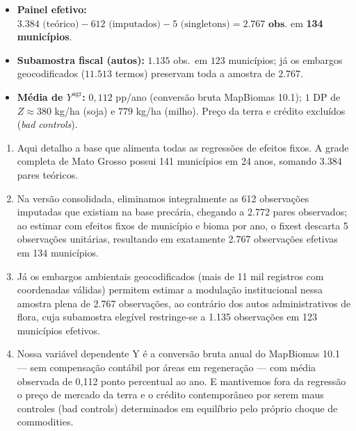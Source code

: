 \documentclass[11pt,a4paper]{article}
\begin{document}
\begin{tcolorbox}[title={\bfseries\small ÂNCORAS EMPÍRICAS E CONCEITUAIS DO SLIDE}]
\begin{itemize}[leftmargin=*,itemsep=1mm,topsep=0.5mm]
    \item \textbf{Painel efetivo:} $\text{3.384 (teórico)} - 612\text{ (imputados)} - 5\text{ (singletons)} = \mathbf{2.767\text{ obs.}}$ em \textbf{134 municípios}.
    \item \textbf{Subamostra fiscal (autos):} $1.135$ obs.\ em $123$ municípios; já os embargos geocodificados ($11.513$ termos) preservam toda a amostra de $2.767$.
    \item \textbf{Média de $Y^{\text{agr}}$:} $0{,}112$ pp/ano (conversão bruta MapBiomas 10.1); $1\text{ DP}$ de $Z \approx 380$ kg/ha (soja) e $779$ kg/ha (milho). Preço da terra e crédito excluídos (\textit{bad controls}).
\end{itemize}
\end{tcolorbox}
\vspace{2mm}

\vspace{0.8mm}
\begin{enumerate}[leftmargin=*,label=\textbf{(\arabic*)},itemsep=2.8mm,topsep=1mm]
    \item Aqui detalho a base que alimenta todas as regressões de efeitos fixos. A grade completa de Mato Grosso possui 141 municípios em 24 anos, somando 3.384 pares teóricos.
    \item Na versão consolidada, eliminamos integralmente as 612 observações imputadas que existiam na base precária, chegando a 2.772 pares observados; ao estimar com efeitos fixos de município e bioma por ano, o fixest descarta 5 observações unitárias, resultando em exatamente 2.767 observações efetivas em 134 municípios.
    \item Já os embargos ambientais geocodificados (mais de 11 mil registros com coordenadas válidas) permitem estimar a modulação institucional nessa amostra plena de 2.767 observações, ao contrário dos autos administrativos de flora, cuja subamostra elegível restringe-se a 1.135 observações em 123 municípios efetivos.
    \item Nossa variável dependente Y é a conversão bruta anual do MapBiomas 10.1 — sem compensação contábil por áreas em regeneração — com média observada de 0,112 ponto percentual ao ano. E mantivemos fora da regressão o preço de mercado da terra e o crédito contemporâneo por serem maus controles (bad controls) determinados em equilíbrio pelo próprio choque de commodities.
\end{enumerate}
\end{document}
